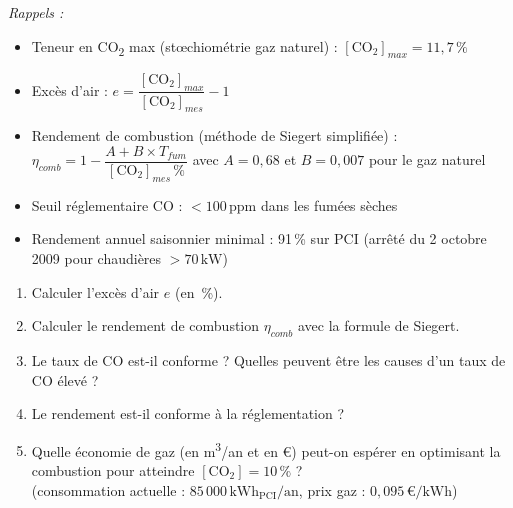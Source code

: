 \textit{Rappels :}
\begin{itemize}
  \item Teneur en CO\textsubscript{2} max (stœchiométrie gaz naturel) : $[\text{CO}_2]_{max} = 11{,}7\,\%$
  \item Excès d'air : $e = \dfrac{[\text{CO}_2]_{max}}{[\text{CO}_2]_{mes}} - 1$
  \item Rendement de combustion (méthode de Siegert simplifiée) : $\eta_{comb} = 1 - \dfrac{A + B \times T_{fum}}{[\text{CO}_2]_{mes}\,\%}$ avec $A = 0{,}68$ et $B = 0{,}007$ pour le gaz naturel
  \item Seuil réglementaire CO : $< 100\,\text{ppm}$ dans les fumées sèches
  \item Rendement annuel saisonnier minimal : 91\,\% sur PCI (arrêté du 2 octobre 2009 pour chaudières $> 70\,\text{kW}$)
\end{itemize}

\begin{enumerate}
  \item Calculer l'excès d'air $e$ (en \,\%).
  \item Calculer le rendement de combustion $\eta_{comb}$ avec la formule de Siegert.
  \item Le taux de CO est-il conforme ? Quelles peuvent être les causes d'un taux de CO élevé ?
  \item Le rendement est-il conforme à la réglementation ?
  \item Quelle économie de gaz (en m\textsuperscript{3}/an et en €) peut-on espérer en optimisant la combustion pour atteindre $[\text{CO}_2] = 10\,\%$ ? \\
  (consommation actuelle : $85\,000\,\text{kWh}_{\text{PCI}}/\text{an}$, prix gaz : $0{,}095\,€/\text{kWh}$)
\end{enumerate}



